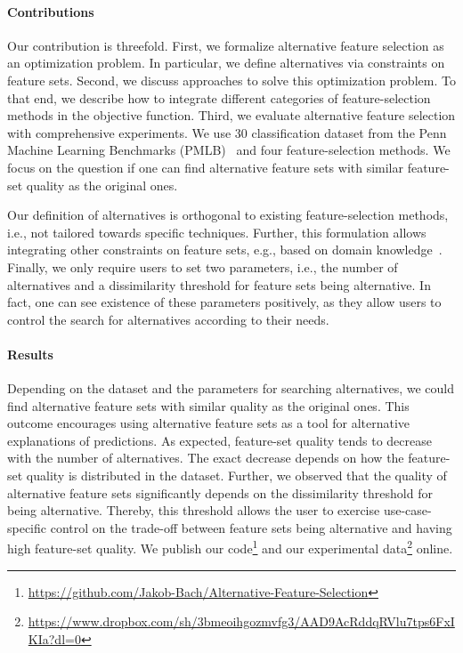 \documentclass{article}
\theoremstyle{definition}
\begin{document}
\paragraph{Contributions}

Our contribution is threefold.
First, we formalize alternative feature selection as an optimization problem.
In particular, we define alternatives via constraints on feature sets.
Second, we discuss approaches to solve this optimization problem.
To that end, we describe how to integrate different categories of feature-selection methods in the objective function.
Third, we evaluate alternative feature selection with comprehensive experiments.
We use 30 classification dataset from the Penn Machine Learning Benchmarks (PMLB)~\cite{olson2017pmlb, romano2021pmlb} and four feature-selection methods.
We focus on the question if one can find alternative feature sets with similar feature-set quality as the original ones.

Our definition of alternatives is orthogonal to existing feature-selection methods, i.e., not tailored towards specific techniques.
Further, this formulation allows integrating other constraints on feature sets, e.g., based on domain knowledge~\cite{bach2022empirical, groves2015toward}.
Finally, we only require users to set two parameters, i.e., the number of alternatives and a dissimilarity threshold for feature sets being alternative.
In fact, one can see existence of these parameters positively, as they allow users to control the search for alternatives according to their needs.

\paragraph{Results}

Depending on the dataset and the parameters for searching alternatives, we could find alternative feature sets with similar quality as the original ones.
This outcome encourages using alternative feature sets as a tool for alternative explanations of predictions.
As expected, feature-set quality tends to decrease with the number of alternatives.
The exact decrease depends on how the feature-set quality is distributed in the dataset.
Further, we observed that the quality of alternative feature sets significantly depends on the dissimilarity threshold for being alternative.
Thereby, this threshold allows the user to exercise use-case-specific control on the trade-off between feature sets being alternative and having high feature-set quality.
We publish our code\footnote{\url{https://github.com/Jakob-Bach/Alternative-Feature-Selection}} and our experimental data\footnote{\url{https://www.dropbox.com/sh/3bmeoihgozmvfg3/AAD9AcRddqRVlu7tps6FxIKIa?dl=0}} online. %
\end{document}
